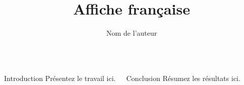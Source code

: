 \documentclass{beamer}
\title{Affiche française}
\author{Nom de l'auteur}
\begin{document}
\begin{frame}
\begin{columns}[t]
  \begin{block}{Introduction}
    Présentez le travail ici.
  \end{block}
  \begin{block}{Conclusion}
    Résumez les résultats ici.
  \end{block}
\end{columns}
\end{frame}
\end{document}
